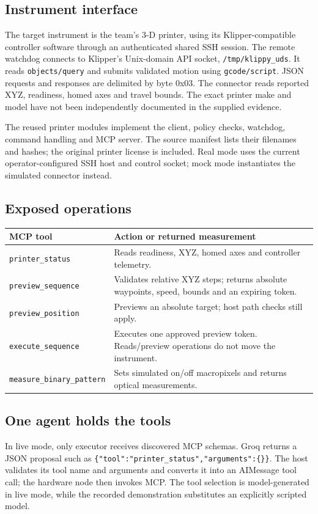 \documentclass[11pt,a4paper]{article}
\newcommand{\code}[1]{\texttt{\small #1}}
\begin{document}
\subsection{Instrument interface}
The target instrument is the team's 3-D printer, using its Klipper-compatible
controller software through an authenticated shared SSH session. The remote
watchdog connects to Klipper's Unix-domain API socket, \code{/tmp/klippy\_uds}.
It reads \code{objects/query} and submits validated motion using \code{gcode/script}.
JSON requests and responses are delimited by byte 0x03. The connector reads
reported XYZ, readiness, homed axes and travel bounds. The exact printer make and
model have not been independently documented in the supplied evidence.

The reused printer modules implement the client, policy checks, watchdog,
command handling and MCP server. The source manifest lists their filenames and
hashes; the original printer license is
included. Real mode uses the current operator-configured SSH host and control
socket; mock mode instantiates the simulated connector instead.

\subsection{Exposed operations}
\begin{tabularx}{\linewidth}{@{}p{43mm}X@{}}
\toprule
\textbf{MCP tool} & \textbf{Action or returned measurement}\\\midrule
\code{printer\_status} & Reads readiness, XYZ, homed axes and controller telemetry.\\
\code{preview\_sequence} & Validates relative XYZ steps; returns absolute waypoints, speed, bounds and an expiring token.\\
\code{preview\_position} & Previews an absolute target; host path checks still apply.\\
\code{execute\_sequence} & Executes one approved preview token. Reads/preview operations do not move the instrument.\\
\code{measure\_binary\_pattern} & Sets simulated on/off macropixels and returns optical measurements.\\\bottomrule
\end{tabularx}

\subsection{One agent holds the tools}
In live mode, only executor receives discovered MCP schemas. Groq returns a JSON
proposal such as \code{\{"tool":"printer\_status","arguments":\{\}\}}. The host
validates its tool name and arguments and converts it into an AIMessage tool call;
the hardware node then invokes MCP. The tool selection is model-generated in live
mode, while the recorded demonstration substitutes an explicitly scripted model.
\end{document}
